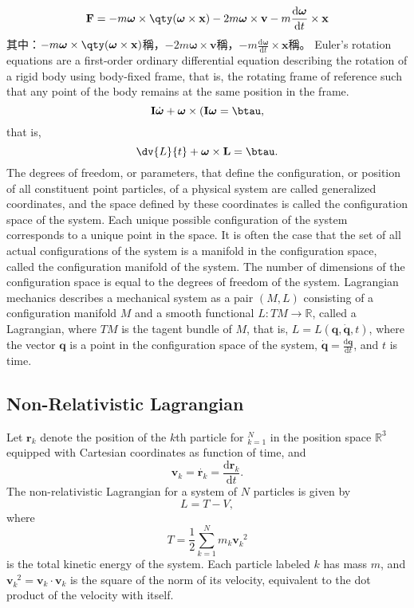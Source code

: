\documentclass[a4paper,12pt]{article}
\begin{document}
\[\mathbf{F}=-m\boldsymbol{\omega}\times\qty(\boldsymbol{\omega}\times\mathbf{x})-2m\boldsymbol{\omega}\times\mathbf{v}-m\frac{\mathrm{d}\boldsymbol{\omega}}{\mathrm{d}t}\times\mathbf{x}\]
其中：$-m\boldsymbol{\omega}\times\qty(\boldsymbol{\omega}\times\mathbf{x})$稱，$-2m\boldsymbol{\omega}\times\mathbf{v}$稱，$-m\frac{\mathrm{d}\boldsymbol{\omega}}{\mathrm{d}t}\times\mathbf{x}$稱。
Euler's rotation equations are a first-order ordinary differential equation describing the rotation of a rigid body using body-fixed frame, that is, the rotating frame of reference such that any point of the body remains at the same position in the frame.
\[\mathbf{I}\dot{\boldsymbol{\omega}}+\boldsymbol{\omega}\times(\mathbf{I}\boldsymbol{\omega}=\btau,\]
that is,
\[\dv{L}{t}+\boldsymbol{\omega}\times\mathbf{L}=\btau.\]
The degrees of freedom, or parameters, that define the configuration, or position of all constituent point particles, of a physical system are called generalized coordinates, and the space defined by these coordinates is called the configuration space of the system. Each unique possible configuration of the system corresponds to a unique point in the space. It is often the case that the set of all actual configurations of the system is a manifold in the configuration space, called the configuration manifold of the system. The number of dimensions of the configuration space is equal to the degrees of freedom of the system.
Lagrangian mechanics describes a mechanical system as a pair $(M,L)$ consisting of a configuration manifold $M$ and a smooth functional $L\colon TM\to\mathbb{R}$, called a Lagrangian, where $TM$ is the tagent bundle of $M$, that is, $L=L(\mathbf{q},\dot{\mathbf{q}},t)$, where the vector $\mathbf{q}$ is a point in the configuration space of the system, $\dot{\mathbf{q}}=\frac{\mathrm{d}\mathbf{q}}{\mathrm{d}t}$, and $t$ is time.
\subsection{Non-Relativistic Lagrangian}
Let $\mathbf{r}_k$ denote the position of the $k$th particle for $_{k=1}^N$ in the position space $\mathbb{R}^3$ equipped with Cartesian coordinates as function of time, and \[\mathbf{v}_k=\dot{\mathbf{r}_k}=\frac{\mathrm{d}\mathbf{r}_k}{\mathrm{d}t}.\]
The non-relativistic Lagrangian for a system of $N$ particles is given by
\[L=T-V,\]
where
\[T=\frac{1}{2}\sum_{k=1}^Nm_k\mathbf{v}_k^{\phantom{k}2}\]
is the total kinetic energy of the system. Each particle labeled $k$ has mass $m$, and $\mathbf{v}_k^{\phantom{k}2}=\mathbf{v}_k\cdot\mathbf{v}_k$ is the square of the norm of its velocity, equivalent to the dot product of the velocity with itself.
\end{document}
